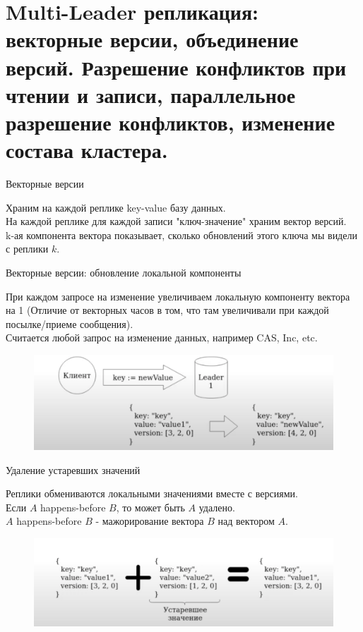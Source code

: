 \section{Multi-Leader репликация: векторные версии, объединение версий. Разрешение конфликтов при чтении и записи, параллельное разрешение конфликтов, изменение состава кластера.}

\begin{definition}
  Векторные версии
\end{definition}
Храним на каждой реплике key-value базу данных. \\
На каждой реплике для каждой записи "ключ-значение" храним вектор
версий. \\
k-ая компонента вектора показывает, сколько обновлений этого ключа мы видели с реплики $k$.
\begin{definition}
  Векторные версии: обновление локальной компоненты
\end{definition}
При каждом запросе на изменение увеличиваем локальную компоненту вектора на 1 (Отличие от векторных часов в том, что там увеличивали при каждой посылке/приеме сообщения). \\
Считается любой запрос на изменение данных, например CAS, Inc, etc.\\
\begin{figure}[h]
    \centering
    \includegraphics[scale = 0.5]{../assets/1.png}
    \caption{}
\end{figure}
\begin{definition}
  Удаление устаревших значений
\end{definition}
Реплики обмениваются локальными значениями вместе с версиями. \\
Если $A$ happens-before $B$, то может быть $A$ удалено. \\
$A$ happens-before $B$ - мажорирование вектора $B$ над вектором $A$.\\
\begin{figure}[h]
    \centering
    \includegraphics[scale = 0.5]{../assets/2.png}
    \caption{}
\end{figure}
